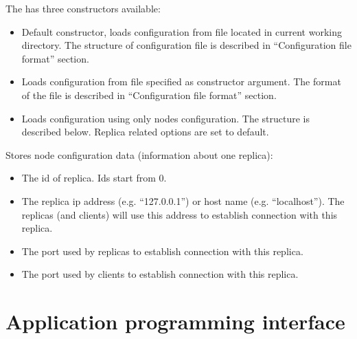 \label{config:jpaxos-configclass}\label{config:configuration-class}
The  has three constructors available:
\begin{itemize}
\item {} 
Default constructor, loads configuration from  file
located in current working directory. The structure of configuration file is
described in ``Configuration file format'' section.

\item {} 
Loads configuration from file specified as constructor argument. The format
of the file is described in ``Configuration file format'' section.

\item {} 
Loads configuration using only nodes configuration. The  structure is
described below. Replica related options are set to default.

\end{itemize}


\label{config:pid-class}
Stores node configuration data (information about one replica):
\begin{itemize}
\item {} 
The id of replica. Ids start from 0.

\item {} 
The replica ip address (e.g. ``127.0.0.1'') or host name (e.g. ``localhost'').
The replicas (and clients) will use this address to establish connection with
this replica.

\item {} 
The port used by replicas to establish connection with this replica.

\item {} 
The port used by clients to establish connection with this replica.

\end{itemize}


\section{Application programming interface}
\label{api:application-programming-interface}\label{api:jpaxos-api}\label{api:code-generation-library}\label{api::doc}

